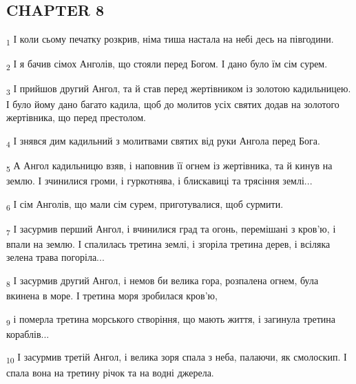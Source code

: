 \subsection{CHAPTER 8}
\begin{tcolorbox}
\textsubscript{1} І коли сьому печатку розкрив, німа тиша настала на небі десь на півгодини.
\end{tcolorbox}
\begin{tcolorbox}
\textsubscript{2} І я бачив сімох Анголів, що стояли перед Богом. І дано було їм сім сурем.
\end{tcolorbox}
\begin{tcolorbox}
\textsubscript{3} І прийшов другий Ангол, та й став перед жертівником із золотою кадильницею. І було йому дано багато кадила, щоб до молитов усіх святих додав на золотого жертівника, що перед престолом.
\end{tcolorbox}
\begin{tcolorbox}
\textsubscript{4} І знявся дим кадильний з молитвами святих від руки Ангола перед Бога.
\end{tcolorbox}
\begin{tcolorbox}
\textsubscript{5} А Ангол кадильницю взяв, і наповнив її огнем із жертівника, та й кинув на землю. І зчинилися громи, і гуркотнява, і блискавиці та трясіння землі...
\end{tcolorbox}
\begin{tcolorbox}
\textsubscript{6} І сім Анголів, що мали сім сурем, приготувалися, щоб сурмити.
\end{tcolorbox}
\begin{tcolorbox}
\textsubscript{7} І засурмив перший Ангол, і вчинилися град та огонь, перемішані з кров'ю, і впали на землю. І спалилась третина землі, і згоріла третина дерев, і всіляка зелена трава погоріла...
\end{tcolorbox}
\begin{tcolorbox}
\textsubscript{8} І засурмив другий Ангол, і немов би велика гора, розпалена огнем, була вкинена в море. І третина моря зробилася кров'ю,
\end{tcolorbox}
\begin{tcolorbox}
\textsubscript{9} і померла третина морського створіння, що мають життя, і загинула третина кораблів...
\end{tcolorbox}
\begin{tcolorbox}
\textsubscript{10} І засурмив третій Ангол, і велика зоря спала з неба, палаючи, як смолоскип. І спала вона на третину річок та на водні джерела.
\end{tcolorbox}
